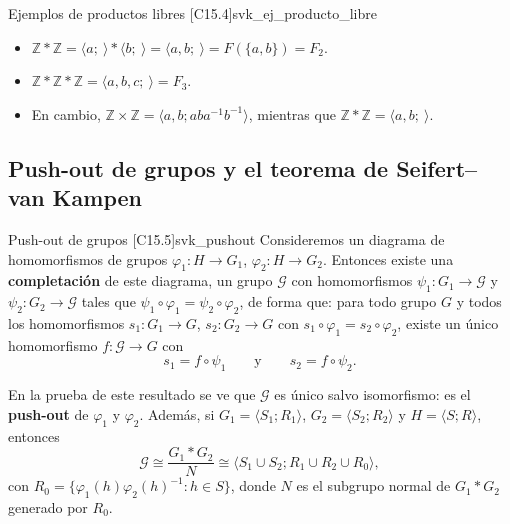 \begin{observacion}{Ejemplos de productos libres [C15.4]}{svk_ej_producto_libre}
\begin{itemize}
    \item $\mathbb{Z} * \mathbb{Z} = \langle a ; \ \rangle * \langle b ; \ \rangle = \langle a, b ; \ \rangle = F(\{a,b\}) = F_2$.
    \item $\mathbb{Z} * \mathbb{Z} * \mathbb{Z} = \langle a, b, c ; \ \rangle = F_3$.
    \item En cambio, $\mathbb{Z} \times \mathbb{Z} = \langle a, b ; aba^{-1}b^{-1} \rangle$, mientras que $\mathbb{Z} * \mathbb{Z} = \langle a, b ; \ \rangle$.
\end{itemize}
\end{observacion}

\subsection{Push-out de grupos y el teorema de Seifert--van Kampen}

\begin{teorema}{Push-out de grupos [C15.5]}{svk_pushout}
Consideremos un diagrama de homomorfismos de grupos $\varphi_1 \colon H \to G_1$, $\varphi_2 \colon H \to G_2$. Entonces existe una \textbf{completación} de este diagrama, un grupo $\mathcal{G}$ con homomorfismos $\psi_1 \colon G_1 \to \mathcal{G}$ y $\psi_2 \colon G_2 \to \mathcal{G}$ tales que $\psi_1 \circ \varphi_1 = \psi_2 \circ \varphi_2$, de forma que: para todo grupo $G$ y todos los homomorfismos $s_1 \colon G_1 \to G$, $s_2 \colon G_2 \to G$ con $s_1 \circ \varphi_1 = s_2 \circ \varphi_2$, existe un único homomorfismo $f \colon \mathcal{G} \to G$ con
\[ s_1 = f \circ \psi_1 \qquad \text{y} \qquad s_2 = f \circ \psi_2. \]
\begin{center}
\end{center}
En la prueba de este resultado se ve que $\mathcal{G}$ es único salvo isomorfismo: es el \textbf{push-out} de $\varphi_1$ y $\varphi_2$. Además, si $G_1 = \langle S_1 ; R_1 \rangle$, $G_2 = \langle S_2 ; R_2 \rangle$ y $H = \langle S ; R \rangle$, entonces
\[ \mathcal{G} \cong \frac{G_1 * G_2}{N} \cong \langle S_1 \cup S_2 ; R_1 \cup R_2 \cup R_0 \rangle, \]
con $R_0 = \{ \varphi_1(h)\varphi_2(h)^{-1} : h \in S \}$, donde $N$ es el subgrupo normal de $G_1 * G_2$ generado por $R_0$.
\end{teorema}

